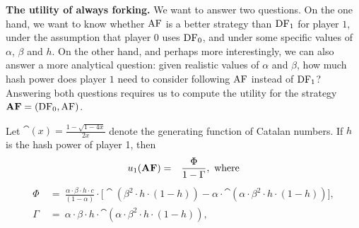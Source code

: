 \noindent
\textbf{The utility of always forking.}
We want to answer two questions. 
On the one hand, we want to know whether $\text{\rm AF}$ is a better strategy than $\text{\rm DF}_1$ for player $1$, under the assumption that player $0$ uses $\text{\rm DF}_0$, and under some specific values of $\alpha$, $\beta$ and $h$. 
On the other hand, and 
perhaps more interestingly, we can also answer a more analytical question: given realistic values of $\alpha$ and $\beta$, how much hash power does player $1$ need to consider following $\text{\rm AF}$ instead of $\text{\rm DF}_1$? 
Answering both questions requires us to compute the utility for the strategy $\text{\rm {\bf AF}}=(\text{\rm DF}_0,\text{\rm AF})$. 

\begin{theorem}\label{thm:always_fork}
Let $\cat(x) = \frac{1-\sqrt{1-4x}}{2x}$ denote the generating function of Catalan numbers.  If $h$ is the hash power of player 1, then
\begin{eqnarray*}
u_1(\text{\rm {\bf AF}}) &=& \frac{\Phi}{1-\Gamma}, \mbox{ where}
\end{eqnarray*}
\begin{align*}
\Phi & \ = \ \frac{\alpha \cdot \beta \cdot h \cdot c}{(1-\alpha)} \cdot \big[\cat(\beta^2 \cdot h \cdot (1-h)) - \alpha\cdot \cat(\alpha \cdot \beta^2 \cdot h \cdot (1-h))\big],\\
\Gamma & \ = \ \alpha \cdot \beta \cdot h \cdot \cat(\alpha\cdot \beta^2 \cdot h \cdot (1-h)),
\end{align*}
\end{theorem}


